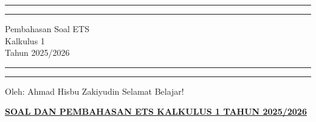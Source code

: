 \documentclass[10pt,openany,a4paper]{article}
\theoremstyle{definition}
\theoremstyle{definition}
\theoremstyle{plain}
\begin{document}
\begin{titlepage}
	\centering %
	\vspace*{1.5\baselineskip} %

	\rule{13cm}{1.6pt}\vspace*{-\baselineskip}\vspace*{2pt} %
	\rule{13cm}{0.4pt} %
	
		\vspace{0.75\baselineskip} %
	{	\Huge Pembahasan Soal ETS\\ 
			\vspace{4mm}
		Kalkulus 1 \\ \vspace{2mm} \huge{Tahun 2025/2026}\\	}
		\vspace{0.75\baselineskip} %
	\rule{13cm}{0.4pt}\vspace*{-\baselineskip}\vspace{3.2pt} %
	\rule{13cm}{1.6pt} %
	
		\vspace{1.75\baselineskip} %
{\large Oleh: Ahmad Hisbu Zakiyudin}
	\vfill
	\vspace{1mm}
\huge{Selamat Belajar!}
\end{titlepage}
\makeatletter
\setlength\fboxsep{3pt}
\setlength{\headheight}{24pt}
 \begin{center}
	{\underline{\textbf{\MakeUppercase{Soal dan Pembahasan ETS Kalkulus 1 Tahun 2025/2026}}}}
    \end{center}
\end{document}
